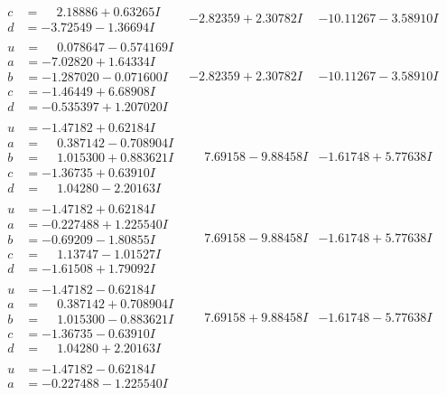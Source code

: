 \documentclass[1p]{elsarticle_modified}
\theoremstyle{definition}
\begin{document}
$$\begin{array}{c|c|c}
\begin{aligned}
c &= \phantom{-}2.18886 + 0.63265 I \\
d &= -3.72549 - 1.36694 I\end{aligned}
 & -2.82359 + 2.30782 I & -10.11267 - 3.58910 I \\ \hline\begin{aligned}
u &= \phantom{-}0.078647 - 0.574169 I \\
a &= -7.02820 + 1.64334 I \\
b &= -1.287020 - 0.071600 I \\
c &= -1.46449 + 6.68908 I \\
d &= -0.535397 + 1.207020 I\end{aligned}
 & -2.82359 + 2.30782 I & -10.11267 - 3.58910 I \\ \hline\begin{aligned}
u &= -1.47182 + 0.62184 I \\
a &= \phantom{-}0.387142 - 0.708904 I \\
b &= \phantom{-}1.015300 + 0.883621 I \\
c &= -1.36735 + 0.63910 I \\
d &= \phantom{-}1.04280 - 2.20163 I\end{aligned}
 & \phantom{-}7.69158 - 9.88458 I & -1.61748 + 5.77638 I \\ \hline\begin{aligned}
u &= -1.47182 + 0.62184 I \\
a &= -0.227488 + 1.225540 I \\
b &= -0.69209 - 1.80855 I \\
c &= \phantom{-}1.13747 - 1.01527 I \\
d &= -1.61508 + 1.79092 I\end{aligned}
 & \phantom{-}7.69158 - 9.88458 I & -1.61748 + 5.77638 I \\ \hline\begin{aligned}
u &= -1.47182 - 0.62184 I \\
a &= \phantom{-}0.387142 + 0.708904 I \\
b &= \phantom{-}1.015300 - 0.883621 I \\
c &= -1.36735 - 0.63910 I \\
d &= \phantom{-}1.04280 + 2.20163 I\end{aligned}
 & \phantom{-}7.69158 + 9.88458 I & -1.61748 - 5.77638 I \\ \hline\begin{aligned}
u &= -1.47182 - 0.62184 I \\
a &= -0.227488 - 1.225540 I \\

\end{aligned}
\end{array}$$
\end{document}
